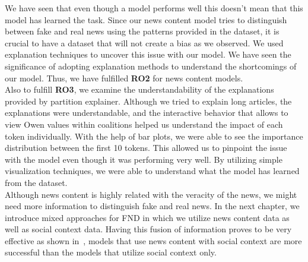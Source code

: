 We have seen that even though a model performs well this doesn't mean that this model has learned the task. Since our news content model tries to distinguish between fake and real news using the patterns provided in the dataset, it is crucial to have a dataset that will not create a bias as we observed. We used explanation techniques to uncover this issue with our model. We have seen the significance of adopting explanation methods to understand the shortcomings of our model. Thus, we have fulfilled \textbf{RO2} for news content models.\\
Also to fulfill \textbf{RO3}, we examine the understandability of the explanations provided by partition explainer. Although we tried to explain long articles, the explanations were understandable, and the interactive behavior that allows to view Owen values within coalitions helped us understand the impact of each token individually. With the help of bar plots, we were able to see the importance distribution between the first 10 tokens. This allowed us to pinpoint the issue with the model even though it was performing very well. By utilizing simple visualization techniques, we were able to understand what the model has learned from the dataset.\\
Although news content is highly related with the veracity of the news, we might need more information to distinguish fake and real news. In the next chapter, we introduce mixed approaches for FND in which we utilize news content data as well as social context data. Having this fusion of information proves to be very effective as shown in~\cite{UPFD_Dataset_Shu}, models that use news content with social context are more successful than the models that utilize social context only.\\